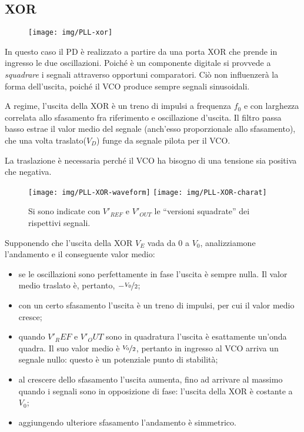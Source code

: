 \subsection{XOR}
\begin{figure}[hbt]
	\centering
	\texttt{[image: img/PLL-xor]}
	\caption{}
	\label{fig:pll-XOR}
\end{figure}


In questo caso il PD è realizzato a partire da una porta XOR che prende in ingresso le due oscillazioni. Poiché è un componente digitale si provvede a \textit{squadrare} i segnali attraverso opportuni comparatori. Ciò non influenzerà la forma dell'uscita, poiché il VCO produce sempre segnali sinusoidali.

A regime, l'uscita della XOR è un treno di impulsi a frequenza $f_0$ e con larghezza correlata allo sfasamento fra riferimento e oscillazione d'uscita. Il filtro passa basso estrae il valor medio del segnale (anch'esso proporzionale allo sfasamento), che una volta traslato($V_D$) funge da segnale pilota per il VCO.

La traslazione è necessaria perché il VCO ha bisogno di una tensione sia positiva che negativa.

\begin{figure}[htb]
	\centering
	\texttt{[image: img/PLL-XOR-waveform]}
	\texttt{[image: img/PLL-XOR-charat]}
	\caption{Si sono indicate con $V'_{REF}$ e $V'_{OUT}$
		le ``versioni squadrate'' dei rispettivi segnali.}
	\label{fig:pll-xor-waveform}
\end{figure}

Supponendo che l'uscita della XOR $V_E$ vada da 0 a $V_0$, analizziamone l'andamento e il conseguente valor medio:
\begin{itemize}
	\item se le oscillazioni sono perfettamente in fase l'uscita è sempre nulla. Il valor medio traslato è, pertanto, $-\nicefrac{V_0}{2}$;
	\item con un certo sfasamento l'uscita è un treno di impulsi, per cui il valor medio cresce;
	\item quando $V'_REF$ e $V'_OUT$ sono in quadratura l'uscita è esattamente un'onda quadra. Il suo valor medio è $\nicefrac{V_0}{2}$, pertanto in ingresso al VCO arriva un segnale nullo: questo è un potenziale punto di stabilità;
	\item al crescere dello sfasamento l'uscita aumenta, fino ad arrivare al massimo quando i segnali sono in opposizione di fase: l'uscita della XOR è costante a $V_0$;
	\item aggiungendo ulteriore sfasamento l'andamento è simmetrico.
\end{itemize}

